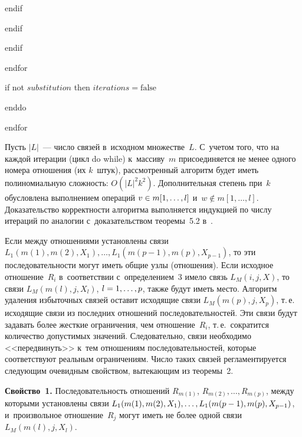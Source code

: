 \begin{multicols}{2}
\hspace*{6mm}endif

\hspace*{5mm}endif

\hspace*{4mm}endif

\hspace*{3mm}endfor

\hspace*{4mm}if not $substitution$ then $iterations=\mathrm{false}$

\hspace*{2mm}enddo

\noindent
endfor

  Пусть $\vert L\vert$~--- число связей в~исходном множестве~$L$. С~учетом
того, что на каждой итерации (цикл do while) к~массиву~$m$ присоединяется
не менее одного номера отношения (их $k$~штук), рассмотренный алгоритм
будет иметь полиномиальную сложность: $O(\vert L\vert^2 k^2)$.
Дополнительная степень при~$k$ обусловлена выполнением операций $v\hm\in
m[1,\ldots, l]$ и~$w\not\in m[1,\ldots, l]$. Доказательство корректности
алгоритма выполняется индукцией по числу итераций по аналогии с~доказательством теоремы~5.2 в~\cite{4-z}.

  Если между отношениями установлены связи $L_1(m(1), m(2), X_1),\ldots ,
L_1(m(p-1),m(p),X_{p-1})$, то эти последовательности могут иметь общие узлы
(отношения). Если исходное отношение~$R_i$ в~соответствии с~определением~3 имело связь $L_M(i,j,X)$, то связи $L_M(m(l),j,X_l)$, $l\hm=
1,\ldots ,p$, также будут иметь место. Алгоритм удаления избыточных связей
оставит исходящие связи $L_M(m(p),j,X_p)$, т.\,е.\linebreak
 исходящие связи из
последних отношений после\-довательностей. Эти связи будут задавать более\linebreak
жесткие ограничения, чем отношение~$R_i$, т.\,е.\ сократится количество
допустимых значений. Следовательно, связи необходимо <<передвинуть>>
к~тем отношениям последовательностей, которые соответствуют реальным
ограничениям. Число таких связей регламентируется следующим очевидным
свойством, вытекающим из теоремы~2.

  \smallskip

  \noindent
  \textbf{Свойство~1.} Последовательность отношений $R_{m(1)}$,
$R_{m(2)},\ldots , R_{m(p)}$, между которыми установлены связи $L_1(m(1),
m(2), X_1),\ldots , L_1(m(p\hm-1),m(p), X_{p-1})$, и~произвольное
отношение~$R_j$ могут иметь не более одной связи $L_M(m(l),j,X_l)$.


\end{multicols}
